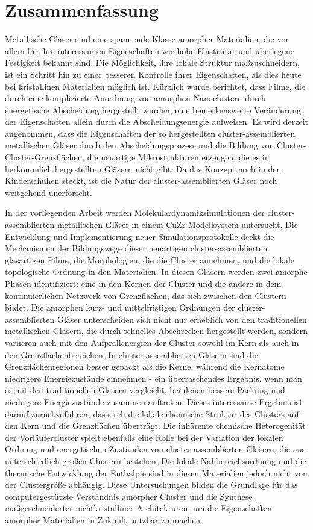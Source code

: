 \section*{Zusammenfassung}
Metallische Gläser sind eine spannende Klasse amorpher Materialien, die vor allem für ihre interessanten Eigenschaften wie hohe Elastizität und überlegene Festigkeit bekannt sind. Die Möglichkeit, ihre lokale Struktur maßzuschneidern, ist ein Schritt hin zu einer besseren Kontrolle ihrer Eigenschaften, als dies heute bei kristallinen Materialien möglich ist. Kürzlich wurde berichtet, dass Filme, die durch eine komplizierte Anordnung von amorphen Nanoclustern durch energetische Abscheidung hergestellt wurden, eine bemerkenswerte Veränderung der Eigenschaften allein durch die Abscheidungsenergie aufweisen. Es wird derzeit angenommen, dass die Eigenschaften der so hergestellten cluster-assemblierten metallischen Gläser durch den Abscheidungsprozess und die Bildung von Cluster-Cluster-Grenzflächen, die neuartige Mikrostrukturen erzeugen, die es in herkömmlich hergestellten Gläsern nicht gibt. Da das Konzept noch in den Kinderschuhen steckt, ist die Natur der cluster-assemblierten Gläser noch weitgehend unerforscht.

In der vorliegenden Arbeit werden Molekulardynamiksimulationen der cluster-assemblierten metallischen Gläser in einem CuZr-Modellsystem untersucht. Die Entwicklung und Implementierung neuer Simulationsprotokolle deckt die Mechanismen der Bildungswege dieser neuartigen cluster-assemblierten glasartigen Filme, die Morphologien, die die Cluster annehmen, und die lokale topologische Ordnung in den Materialien. In diesen Gläsern werden zwei amorphe Phasen identifiziert: eine in den Kernen der Cluster und die andere in dem kontinuierlichen Netzwerk von Grenzflächen, das sich zwischen den Clustern bildet. Die amorphen kurz- und mittelfristigen Ordnungen der cluster-assemblierten Gläser unterscheiden sich nicht nur erheblich von den traditionellen metallischen Gläsern, die durch schnelles Abschrecken hergestellt werden, sondern variieren auch mit den Aufprallenergien der Cluster sowohl im Kern als auch in den Grenzflächenbereichen. In cluster-assemblierten Gläsern sind die Grenzflächenregionen besser gepackt als die Kerne, während die Kernatome niedrigere Energiezustände einnehmen - ein überraschendes Ergebnis, wenn man es mit den traditionellen Gläsern vergleicht, bei denen bessere Packung und niedrigere Energiezustände zusammen auftreten. Dieses interessante Ergebnis ist darauf zurückzuführen, dass sich die lokale chemische Struktur des Clusters auf den Kern und die Grenzflächen überträgt. Die inhärente chemische Heterogenität der Vorläufercluster spielt ebenfalls eine Rolle bei der Variation der lokalen Ordnung und energetischen Zuständen von cluster-assemblierten Gläsern, die aus unterschiedlich großen Clustern bestehen. Die lokale Nahbereichsordnung und die thermische Entwicklung der Enthalpie sind in diesen Materialien jedoch nicht von der Clustergröße abhängig. Diese Untersuchungen bilden die Grundlage für das computergestützte Verständnis amorpher Cluster und die Synthese maßgeschneiderter nichtkristalliner Architekturen, um die Eigenschaften amorpher Materialien in Zukunft nutzbar zu machen.

